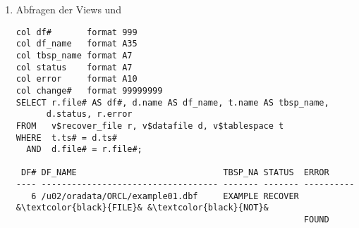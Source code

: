 \begin{enumerate}
\begin{enumerate}
\begin{lstlisting}[texcl=true, caption={Status der Datendateien abfragen mit V\$RECOVER\_FILE},label=admin1437,language=oracle_sql,emph={[10]FILE,OFFLINE,CHANGE, TIME, NOT},emphstyle={[10]\color{black}}]
&\textcolor{black}{FILE\#}& ERROR         ONLINE_ &\textcolor{black}{CHANGE\#}& &\textcolor{black}{TIME}& 
----- ------------------------------- ----------------- ------------------- -------
6    &\textcolor{black}{FILE}& &\textcolor{black}{NOT}& FOUND &\textcolor{black}{OFFLINE}&         0
              \end{lstlisting}
              Zus\"atzlich zu  zeigt sie an, dass eine Datendatei defekte Bl\"ocke enth\"alt. Im Gegensatz zu  kann sie nur dann verwendet werden, wenn die Kontrolldatei nicht wiederhergestellt werden musste.
\clearpage
            \item Abfragen der Views  und 
              \begin{lstlisting}[caption={Status der Datendateien abfragen},label=admin1438,language=oracle_sql,alsolanguage=sqlplus,emph={[9]FILE,OFFLINE,CHANGE, TIME, NOT},emphstyle={[9]\color{black}}]
col df#       format 999
col df_name   format A35
col tbsp_name format A7
col status    format A7
col error     format A10
col change#   format 99999999
SELECT r.file# AS df#, d.name AS df_name, t.name AS tbsp_name,
      d.status, r.error
FROM   v$recover_file r, v$datafile d, v$tablespace t
WHERE  t.ts# = d.ts#
  AND  d.file# = r.file#;

 DF# DF_NAME                             TBSP_NA STATUS  ERROR       
---- ----------------------------------- ------- ------- ----------
   6 /u02/oradata/ORCL/example01.dbf     EXAMPLE RECOVER &\textcolor{black}{FILE}& &\textcolor{black}{NOT}&
                                                         FOUND
              \end{lstlisting}
          \end{enumerate}
        \end{enumerate}
